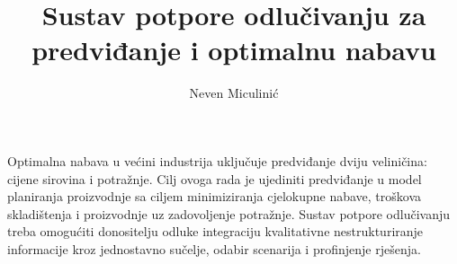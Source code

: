 \documentclass[times, utf8, zavrsni]{fer}
\begin{document}
\theoremstyle{definition}
\newtheorem{definition}{Definition}[section]

\title{Sustav potpore odlučivanju za predviđanje i optimalnu nabavu
}
\author{Neven Miculinić}

\maketitle

\tableofcontents












\begin{sazetak}
    Optimalna nabava u većini industrija uključuje predviđanje dviju veliničina: cijene sirovina i potražnje. Cilj ovoga rada je ujediniti predviđanje u model planiranja proizvodnje sa ciljem minimiziranja cjelokupne nabave, troškova skladištenja i proizvodnje uz zadovoljenje potražnje. Sustav potpore odlučivanju treba omogućiti donositelju odluke integraciju kvalitativne nestrukturiranje informacije kroz jednostavno sučelje, odabir scenarija i profinjenje rješenja.
\end{sazetak}

\end{document}
